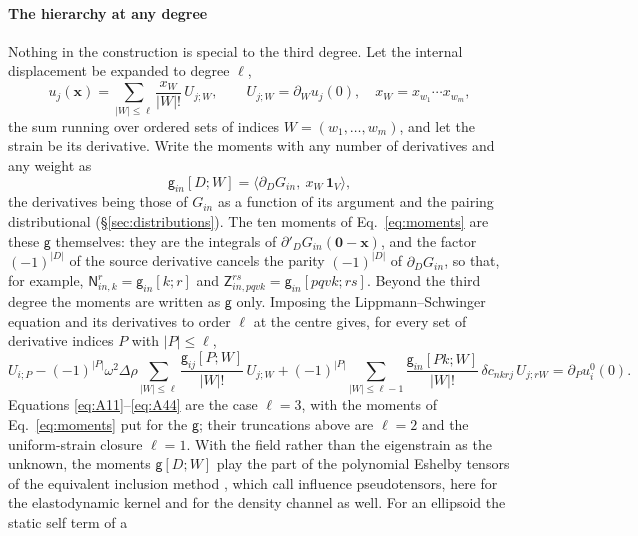 \documentclass[preprint,review,12pt]{elsarticle}
\begin{document}
\paragraph{The hierarchy at any degree} Nothing in the construction is special to the third degree.
Let the internal displacement be expanded to degree $\ell$,
\begin{equation}\label{eq:taylorfield}
  u_j(\mathbf x)=\sum_{|W|\le\ell}\frac{x_W}{|W|!}\,U_{j;W},\qquad
  U_{j;W}=\partial_Wu_j(0),\quad x_W=x_{w_1}\cdots x_{w_m},
\end{equation}
the sum running over ordered sets of indices $W=(w_1,\dots,w_m)$, and let the strain be its derivative.
Write the moments with any number of derivatives and any weight as
\begin{equation}\label{eq:gmoment}
  \mathsf g_{in}[D;W]=\bigl\langle\partial_DG_{in},\ x_W\,\mathbf 1_V\bigr\rangle ,
\end{equation}
the derivatives being those of $G_{in}$ as a function of its argument and the pairing distributional
(\S\ref{sec:distributions}). The ten moments of Eq.~\eqref{eq:moments} are these $\mathsf g$
themselves: they are the integrals of $\partial'_D G_{in}(\mathbf 0-\mathbf x)$, and the factor
$(-1)^{|D|}$ of the source derivative cancels the parity $(-1)^{|D|}$ of $\partial_DG_{in}$, so that,
for example, $\mathsf N^r_{in,k}=\mathsf g_{in}[k;r]$ and $\mathsf Z^{rs}_{in,pqvk}=\mathsf
g_{in}[pqvk;rs]$. Beyond the third degree the moments are written as $\mathsf g$ only. Imposing the Lippmann--Schwinger
equation and its derivatives to order $\ell$ at the centre gives, for every set of derivative indices
$P$ with $|P|\le\ell$,
\begin{equation}\label{eq:hierarchy}
  U_{i;P}-(-1)^{|P|}\omega^2\Delta\rho\sum_{|W|\le\ell}\frac{\mathsf g_{ij}[P;W]}{|W|!}\,U_{j;W}
  +(-1)^{|P|}\sum_{|W|\le\ell-1}\frac{\mathsf g_{in}[Pk;W]}{|W|!}\,\delta c_{nkrj}\,U_{j;rW}
  =\partial_Pu^0_i(0).
\end{equation}
Equations \eqref{eq:A11}--\eqref{eq:A44} are the case $\ell=3$, with the moments of
Eq.~\eqref{eq:moments} put for the $\mathsf g$; their truncations above are $\ell=2$ and the
uniform-strain closure $\ell=1$. With the field rather than the eigenstrain as the unknown, the
moments $\mathsf g[D;W]$ play the part of the polynomial Eshelby tensors of the equivalent inclusion
method \citep[Ch.~4]{Mura1987}, which \citet{Brisard2014} call influence pseudotensors, here for the
elastodynamic kernel and for the density channel as well. For an ellipsoid the static self term of a
\end{document}
